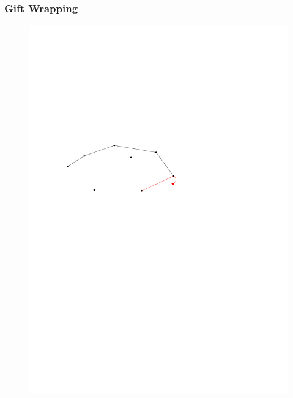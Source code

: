 \begin{frame}
	\frametitle{{Gift Wrapping}}
\begin{figure}[htbp]
	\begin{center}
  	\includegraphics[width=.8\linewidth]{bilder/giftwrap5}
	\end{center}
\end{figure}
\end{frame}

